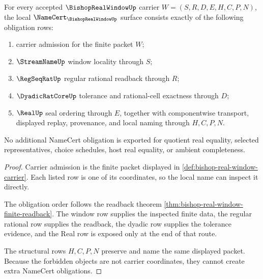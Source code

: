 \begin{theorem}
\label{thm:bishop-real-window-namecert-obligations}
For every accepted $\BishopRealWindowUp$ carrier $W=(S,R,D,E,H,C,P,N)$, the local $\NameCert_{\BishopRealWindowUp}$ surface consists exactly of the following obligation rows:
\begin{enumerate}
\item carrier admission for the finite packet $W$;
\item $\StreamNameUp$ window locality through $S$;
\item $\RegSeqRatUp$ regular rational readback through $R$;
\item $\DyadicRatCoreUp$ tolerance and rational-cell exactness through $D$;
\item $\RealUp$ seal ordering through $E$, together with componentwise transport, displayed replay, provenance, and local naming through $H,C,P,N$.
\end{enumerate}
No additional NameCert obligation is exported for quotient real equality, selected representatives, choice schedules, host real equality, or ambient completeness.
\end{theorem}
\begin{proof}
Carrier admission is the finite packet displayed in \autoref{def:bishop-real-window-carrier}. Each listed row is one of its coordinates, so the local name can inspect it directly.

The obligation order follows the readback theorem \autoref{thm:bishop-real-window-finite-readback}. The window row supplies the inspected finite data, the regular rational row supplies the readback, the dyadic row supplies the tolerance evidence, and the Real row is exposed only at the end of that route.

The structural rows $H,C,P,N$ preserve and name the same displayed packet. Because the forbidden objects are not carrier coordinates, they cannot create extra NameCert obligations.
\end{proof}



